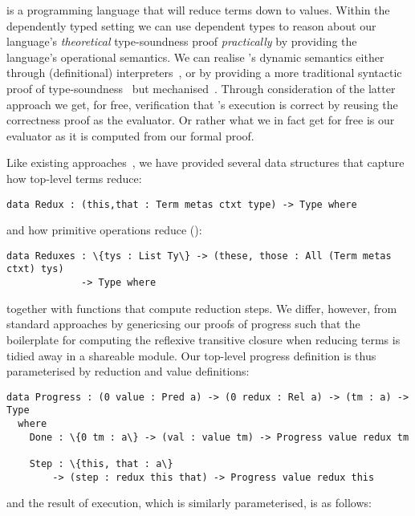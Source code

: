 \Velo{} is a programming language that will reduce terms down to values.
%
Within the dependently typed setting we can use dependent types to reason about our language's \emph{theoretical} type-soundness proof \emph{practically} by providing the language's operational semantics.
%
We can realise \Velo{}'s dynamic semantics either through (definitional) interpreters~\cite{10.1145/3093333.3009866,Augustsson1999edt}, or by providing a more traditional syntactic proof of type-soundness~\cite{DBLP:journals/iandc/WrightF94} but mechanised~\cite[Part 2: Properties]{plfa22.08}.
%
Through consideration of the latter approach we get, for free, verification that \Velo{}'s execution is correct by reusing the correctness proof as the evaluator.
%
Or rather what we in fact get for free is our evaluator as it is computed from our formal proof.

Like existing approaches~\cite[Part 2: Properties]{plfa22.08}, we have provided several data structures that capture how top-level terms reduce:

\begin{Verbatim}
data Redux : (this,that : Term metas ctxt type) -> Type where
\end{Verbatim}

\noindent
and how primitive operations reduce ():

\begin{Verbatim}
data Reduxes : \{tys : List Ty\} -> (these, those : All (Term metas ctxt) tys)
             -> Type where
\end{Verbatim}

\noindent
together with functions that compute reduction steps.
%
We differ, however, from standard approaches by genericsing our proofs of progress such that the boilerplate for computing the reflexive transitive closure when reducing terms is tidied away in a shareable module.
%
Our top-level progress definition is thus parameterised by reduction and value definitions:

\begin{Verbatim}
data Progress : (0 value : Pred a) -> (0 redux : Rel a) -> (tm : a) -> Type
  where
    Done : \{0 tm : a\} -> (val : value tm) -> Progress value redux tm

    Step : \{this, that : a\}
        -> (step : redux this that) -> Progress value redux this
\end{Verbatim}

\noindent
and the result of execution, which is similarly parameterised, is as follows:

